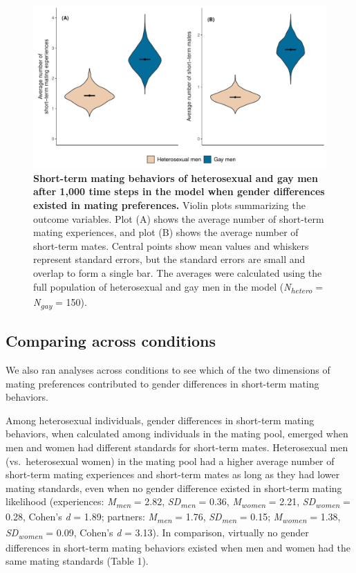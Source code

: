 \documentclass[
  11pt,
]{article}
\begin{document}
\begin{figure}[h]
  \centering
  \includegraphics[width=0.8\columnwidth]{figures/fig2_hetero_vs_gay_men.pdf}
  \caption{\textbf{Short-term mating behaviors of heterosexual and gay men after 1,000 time steps in the model when gender differences existed in mating preferences.} Violin plots summarizing the outcome variables. Plot (A) shows the average number of short-term mating experiences, and plot (B) shows the average number of short-term mates. Central points show mean values and whiskers represent standard errors, but the standard errors are small and overlap to form a single bar. The averages were calculated using the full population of heterosexual and gay men in the model (\textit{N\textsubscript{hetero}} = \textit{N\textsubscript{gay}} = 150).}
\end{figure}

\hypertarget{comparing-across-conditions}{%
\subsection{Comparing across
conditions}\label{comparing-across-conditions}}

We also ran analyses across conditions to see which of the two
dimensions of mating preferences contributed to gender differences in
short-term mating behaviors.

Among heterosexual individuals, gender differences in short-term mating
behaviors, when calculated among individuals in the mating pool, emerged
when men and women had different standards for short-term mates.
Heterosexual men (vs.~heterosexual women) in the mating pool had a
higher average number of short-term mating experiences and short-term
mates as long as they had lower mating standards, even when no gender
difference existed in short-term mating likelihood (experiences:
\emph{M\textsubscript{men}} = 2.82, \emph{SD\textsubscript{men}} = 0.36,
\emph{M\textsubscript{women}} = 2.21, \emph{SD\textsubscript{women}} =
0.28, Cohen's \emph{d} = 1.89; partners: \emph{M\textsubscript{men}} =
1.76, \emph{SD\textsubscript{men}} = 0.15; \emph{M\textsubscript{women}}
= 1.38, \emph{SD\textsubscript{women}} = 0.09, Cohen's \emph{d} = 3.13).
In comparison, virtually no gender differences in short-term mating
behaviors existed when men and women had the same mating standards
(Table 1).
\end{document}
